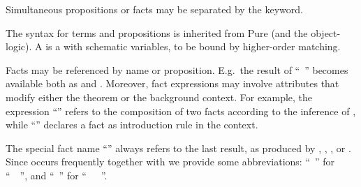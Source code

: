 \begin{isabellebody}
\begin{isamarkuptext}
  \medskip Simultaneous propositions or facts may be separated by the
  \hyperlink{keyword.and}{\mbox{}} keyword.

  \medskip The syntax for terms and propositions is inherited from
  Pure (and the object-logic).  A  is a  with schematic variables, to be bound by higher-order
  matching.

  \medskip Facts may be referenced by name or proposition.  E.g.\ the
  result of ``\hyperlink{command.have}{\mbox{}}~'' becomes
  available both as  and \isacharbackquoteopen{}\isacharbackquoteclose.  Moreover, fact expressions may involve
  attributes that modify either the theorem or the background context.
  For example, the expression ``'' refers to the
  composition of two facts according to the \hyperlink{inference.resolution}{\mbox{}}
  inference of , while ``'' declares a fact as introduction rule in the context.

  The special fact name ``\hyperlink{fact.this}{\mbox{}}'' always refers to the last
  result, as produced by \hyperlink{command.note}{\mbox{}}, \isa{{\isachardoublequote}{\isasymASSM}{\isachardoublequote}}, \hyperlink{command.have}{\mbox{}}, or \hyperlink{command.show}{\mbox{}}.  Since \hyperlink{command.note}{\mbox{}} occurs
  frequently together with \hyperlink{command.then}{\mbox{}} we provide some
  abbreviations: ``\hyperlink{command.from}{\mbox{}}~'' for ``\hyperlink{command.note}{\mbox{}}~~\hyperlink{command.then}{\mbox{}}'', and ``\hyperlink{command.with}{\mbox{}}~'' for ``\hyperlink{command.from}{\mbox{}}~~\hyperlink{keyword.and}{\mbox{}}~\hyperlink{fact.this}{\mbox{}}''.


\end{isamarkuptext}
\end{isabellebody}
